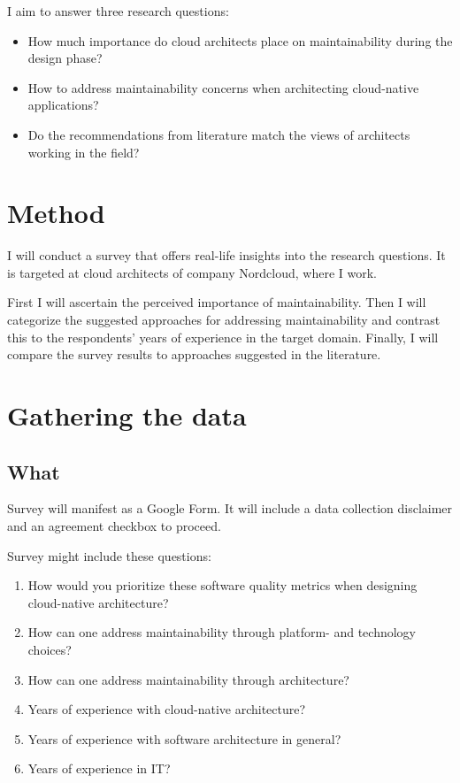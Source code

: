 \documentclass[utf8,english]{gradu3}
\begin{document}
I aim to answer three research questions:
\begin{itemize}
  \item How much importance do cloud architects place on maintainability during
        the design phase?
  \item How to address maintainability concerns when architecting cloud-native
        applications?
  \item Do the recommendations from literature match the views of architects
        working in the field?
\end{itemize}


\chapter{Method}

I will conduct a survey that offers real-life insights into the research questions.
It is targeted at cloud architects of company Nordcloud, where I work.

First I will ascertain the perceived importance of maintainability.
Then I will categorize the suggested approaches for addressing maintainability
and contrast this to the respondents' years of experience in the target domain.
Finally, I will compare the survey results to approaches suggested in the literature.


\chapter{Gathering the data}

\section{What}
Survey will manifest as a Google Form.
It will include a data collection disclaimer and an agreement checkbox to proceed.

Survey might include these questions:
\begin{enumerate}
  \item How would you prioritize these software quality metrics when designing cloud-native
        architecture?
  \item How can one address maintainability through platform- and technology choices?
  \item How can one address maintainability through architecture?
  \item Years of experience with cloud-native architecture?
  \item Years of experience with software architecture in general?
  \item Years of experience in IT?
\end{enumerate}
\end{document}
